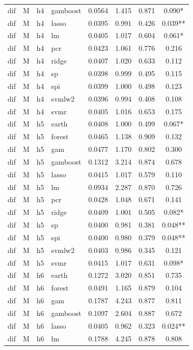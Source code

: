 \begin{ThreePartTable}
\begin{longtable}[t]{llclcccc}
dif & M & h4 & gamboost & 0.0564 & 1.415 & 0.871 & 0.090*\\
dif & M & h4 & lasso & 0.0395 & 0.991 & 0.426 & 0.039**\\
dif & M & h4 & lm & 0.0405 & 1.017 & 0.604 & 0.061*\\
dif & M & h4 & pcr & 0.0423 & 1.061 & 0.776 & 0.216\\
dif & M & h4 & ridge & 0.0407 & 1.020 & 0.633 & 0.112\\
dif & M & h4 & sp & 0.0398 & 0.999 & 0.495 & 0.115\\
dif & M & h4 & spi & 0.0399 & 1.000 & 0.498 & 0.123\\
dif & M & h4 & svmlw2 & 0.0396 & 0.994 & 0.408 & 0.108\\
dif & M & h4 & svmr & 0.0405 & 1.016 & 0.653 & 0.175\\
\addlinespace
dif & M & h5 & earth & 0.0408 & 1.000 & 0.499 & 0.067*\\
dif & M & h5 & forest & 0.0465 & 1.138 & 0.909 & 0.132\\
dif & M & h5 & gam & 0.0477 & 1.170 & 0.802 & 0.300\\
dif & M & h5 & gamboost & 0.1312 & 3.214 & 0.874 & 0.678\\
dif & M & h5 & lasso & 0.0415 & 1.017 & 0.579 & 0.110\\
dif & M & h5 & lm & 0.0934 & 2.287 & 0.870 & 0.726\\
dif & M & h5 & pcr & 0.0428 & 1.048 & 0.671 & 0.141\\
dif & M & h5 & ridge & 0.0409 & 1.001 & 0.505 & 0.082*\\
dif & M & h5 & sp & 0.0400 & 0.981 & 0.381 & 0.048**\\
dif & M & h5 & spi & 0.0400 & 0.980 & 0.379 & 0.048**\\
dif & M & h5 & svmlw2 & 0.0403 & 0.986 & 0.345 & 0.121\\
dif & M & h5 & svmr & 0.0415 & 1.017 & 0.631 & 0.098*\\
\addlinespace
dif & M & h6 & earth & 0.1272 & 3.020 & 0.851 & 0.735\\
dif & M & h6 & forest & 0.0491 & 1.165 & 0.879 & 0.104\\
dif & M & h6 & gam & 0.1787 & 4.243 & 0.877 & 0.811\\
dif & M & h6 & gamboost & 0.1097 & 2.604 & 0.887 & 0.672\\
dif & M & h6 & lasso & 0.0405 & 0.962 & 0.323 & 0.024**\\
dif & M & h6 & lm & 0.1788 & 4.245 & 0.878 & 0.808\\

\end{longtable}
\end{ThreePartTable}
